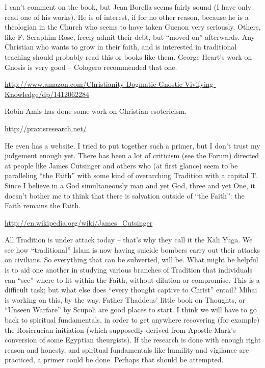 \begin{footnotesize}
\begin{sffamily}
I can't comment on the book, but Jean Borella seems fairly sound (I have only read one of his works). He is of interest, if for no other reason, because he is a theologian in the Church who seems to have taken Guenon very seriously. Others, like F. Seraphim Rose, freely admit their debt, but ``moved on'' afterwards. Any Christian who wants to grow in their faith, and is interested in traditional teaching should probably read this or books like them. George Heart's work on Gnosis is very good -- Cologero recommended that one.

\url{http://www.amazon.com/Christianity-Dogmatic-Gnostic-Vivifying-Knowledge/dp/1412062284}

Robin Amis has done some work on Christian esotericism.

\url{http://praxisresearch.net/}

He even has a website. I tried to put together such a primer, but I don't trust my judgement enough yet. There has been a lot of criticism (see the Forum) directed at people like James Cutsinger and others who (at first glance) seem to be paralleling ``the Faith'' with some kind of overarching Tradition with a capital T. Since I believe in a God simultaneously man and yet God, three and yet One, it doesn't bother me to think that there is salvation outside of ``the Faith'': the Faith remains the Faith.

\url{http://en.wikipedia.org/wiki/James_Cutsinger}

All Tradition is under attack today -- that's why they call it the Kali Yuga. We see how ``traditional'' Islam is now having suicide bombers carry out their attacks on civilians. So everything that can be subverted, will be. What might be helpful is to aid one another in studying various branches of Tradition that individuals can ``see'' where to fit within the Faith, without dilution or compromise. This is a difficult task; but what else does ``every thought captive to Christ'' entail? Mihai is working on this, by the way. Father Thaddeus' little book on Thoughts, or ``Unseen Warfare'' by Scupoli are good places to start. I think we will have to go back to spiritual fundamentals, in order to get anywhere recovering (for example) the Rosicrucian initiation (which supposedly derived from Apostle Mark's conversion of some Egyptian theurgists). If the research is done with enough right reason and honesty, and spiritual fundamentals like humility and vigilance are practiced, a primer could be done. Perhaps that should be attempted.


\end{sffamily}
\end{footnotesize}
